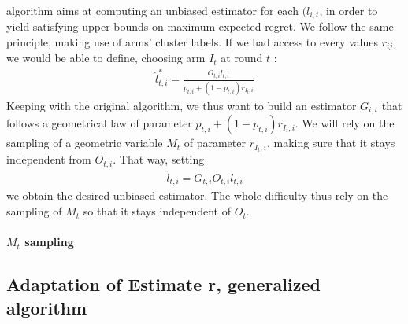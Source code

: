 \documentclass[11pt,a4paper]{article}
\begin{document}
\paragraph{}\cite{valko} algorithm aims at computing an unbiased estimator for each $(l_{i,t}$, in order to yield satisfying upper bounds on maximum expected regret. We follow the same principle, making use of arms' cluster labels. If we had access to every values $r_{ij}$, we would be able to define, choosing arm $I_t$ at round $t$ :
\begin{align*}
\hat{l}_{t,i}^{*} = \frac{O_{t,i}l_{t,i}}{p_{t,i}+(1-p_{t,i})r_{I_t,i}}
\end{align*}
Keeping with the original algorithm, we thus want to build an estimator $G_{i,t}$ that follows a geometrical law of parameter $p_{t,i}+(1-p_{t,i})r_{I_t,i}$. We will rely on the sampling of a geometric variable $M_t$ of parameter $r_{I_t,i}$, making sure that it stays independent from $O_{t,i}$. That way, setting
\begin{align*}
\hat{l}_{t,i}=G_{t,i}O_{t,i}l_{t,i}
\end{align*}
we obtain the desired unbiased estimator. The whole difficulty thus rely on the sampling of $M_t$ so that it stays independent of $O_t$.

\paragraph{$M_t$ sampling}


\subsection{Adaptation of Estimate r, generalized algorithm}
\end{document}
